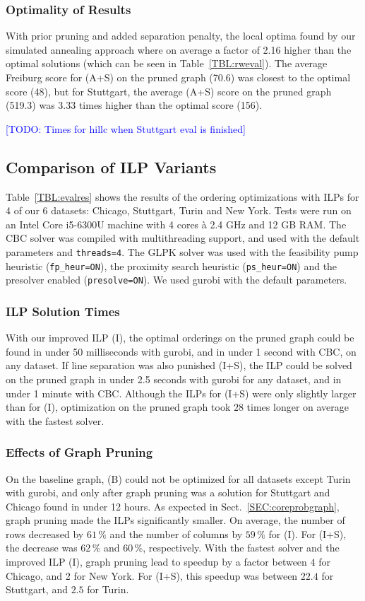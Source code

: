 \documentclass[format=acmsmall, review=false, screen=true]{acmart}
\newcommand\TODO[1]{\textcolor{blue}{\small [TODO: #1]}}
\begin{document}
\subsubsection{Optimality of Results} With prior pruning and added separation penalty, the local optima found by our simulated annealing approach where on average a factor of 2.16 higher than the optimal solutions (which can be seen in Table~\ref{TBL:rweval}). The average Freiburg score for (A+S) on the pruned graph (70.6) was closest to the optimal score (48), but for Stuttgart, the average (A+S) score on the pruned graph (519.3) was 3.33 times higher than the optimal score (156).

\TODO{Times for hillc when Stuttgart eval is finished}

\subsection{Comparison of ILP Variants}

Table~\ref{TBL:evalres} shows the results of the ordering optimizations with ILPs for 4 of our 6 datasets: Chicago, Stuttgart, Turin and New York.
Tests were run on an Intel Core i5-6300U machine with 4 cores \`{a} 2.4 GHz and 12 GB RAM.
The CBC solver was compiled with multithreading support, and used with the default parameters and \texttt{threads=4}.
The GLPK solver was used with the feasibility pump heuristic (\texttt{fp\_heur=ON}), the proximity search heuristic (\texttt{ps\_heur=ON}) and the presolver enabled (\texttt{presolve=ON}).
We used gurobi with the default parameters.
\subsubsection{ILP Solution Times} With our improved ILP (I), the optimal orderings on the pruned graph could be found in under 50 milliseconds with gurobi, and in under 1 second with CBC, on any dataset.
If line separation was also punished (I+S), the ILP could be solved on the pruned graph in under 2.5 seconds with gurobi for any dataset, and in under 1 minute with CBC.
Although the ILPs for (I+S) were only slightly larger than for (I), optimization on the pruned graph took $28$ times longer on average with the fastest solver.
\subsubsection{Effects of Graph Pruning} On the baseline graph, (B) could not be optimized for all datasets except Turin with gurobi, and only after graph pruning  was a solution for Stuttgart and Chicago found in under 12 hours.
As expected in Sect.~\ref{SEC:coreprobgraph}, graph pruning made the ILPs  significantly smaller.
On average, the number of rows decreased by $61\,\%$ and the number of columns by $59\,\%$ for (I). For (I+S), the decrease was $62\,\%$ and $60\,\%$, respectively. With the fastest solver and the improved ILP (I), graph pruning lead to speedup by a factor between $4$ for Chicago, and 2 for New York. For (I+S), this speedup was between $22.4$ for Stuttgart, and $2.5$ for Turin.
\end{document}
